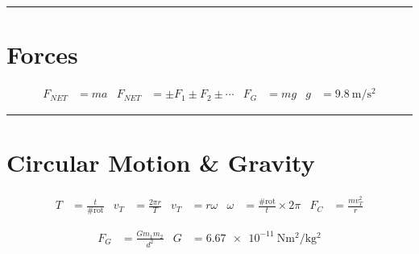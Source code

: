 \documentclass[11pt]{exam}
\begin{document}
    
\hrule
\section*{Forces}

  \begin{align*}
    F_{NET} &=  ma
  & F_{NET} &=  \pm F_1 \pm F_2 \pm \cdots
  & F_G     &=  mg
  & g       &= \SI{9.8}{\meter\per\second^2}
\end{align*}


\hrule
\section*{Circular Motion \& Gravity}

    
    \begin{align*}
        T     &=  \frac{t}{\text{\#rot}}
      & v_T   &=  \frac{2\pi r}{T}
      & v_T   &=  r\omega
      & \omega&= \frac{\text{\#rot}}{t}\times 2\pi
      & F_C   &= \frac{mv_T^2}{r}
    \end{align*}

  \begin{align*}
    F_G &= \frac{Gm_1m_2}{d^2} 
    & G &= \SI{6.67e-11}{\newton\meter^2\per\kilo\gram^2}
  \end{align*}
\end{document}
